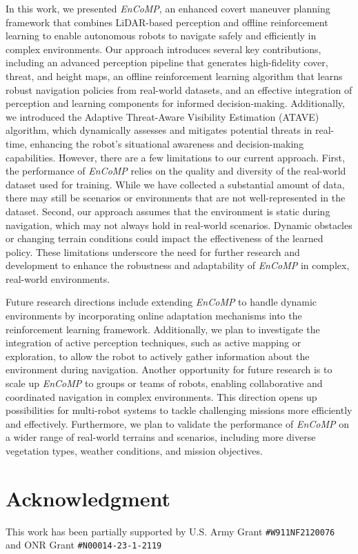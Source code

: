 In this work, we presented \textit{EnCoMP}, an enhanced covert maneuver planning framework that combines LiDAR-based perception and offline reinforcement learning to enable autonomous robots to navigate safely and efficiently in complex environments. Our approach introduces several key contributions, including an advanced perception pipeline that generates high-fidelity cover, threat, and height maps, an offline reinforcement learning algorithm that learns robust navigation policies from real-world datasets, and an effective integration of perception and learning components for informed decision-making. Additionally, we introduced the Adaptive Threat-Aware Visibility Estimation (ATAVE) algorithm, which dynamically assesses and mitigates potential threats in real-time, enhancing the robot's situational awareness and decision-making capabilities.
However, there are a few limitations to our current approach. First, the performance of \textit{EnCoMP} relies on the quality and diversity of the real-world dataset used for training. While we have collected a substantial amount of data, there may still be scenarios or environments that are not well-represented in the dataset. Second, our approach assumes that the environment is static during navigation, which may not always hold in real-world scenarios. Dynamic obstacles or changing terrain conditions could impact the effectiveness of the learned policy. These limitations underscore the need for further research and development to enhance the robustness and adaptability of \textit{EnCoMP} in complex, real-world environments.

Future research directions include extending \textit{EnCoMP} to handle dynamic environments by incorporating online adaptation mechanisms into the reinforcement learning framework. Additionally, we plan to investigate the integration of active perception techniques, such as active mapping or exploration, to allow the robot to actively gather information about the environment during navigation. Another opportunity for future research is to scale up \textit{EnCoMP} to groups or teams of robots, enabling collaborative and coordinated navigation in complex environments. This direction opens up possibilities for multi-robot systems to tackle challenging missions more efficiently and effectively. Furthermore, we plan to validate the performance of \textit{EnCoMP} on a wider range of real-world terrains and scenarios, including more diverse vegetation types, weather conditions, and mission objectives.

\section*{Acknowledgment}
This work has been partially supported by U.S. Army Grant \texttt{\#W911NF2120076} and ONR Grant \texttt{\#N00014-23-1-2119}